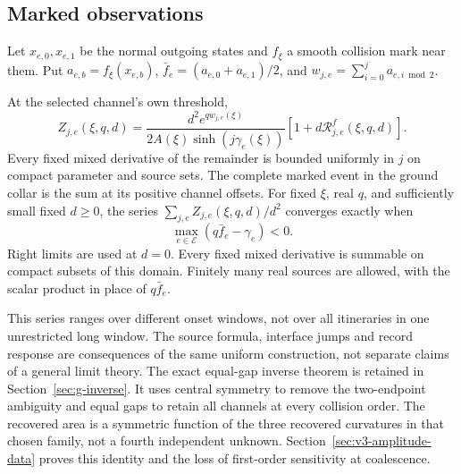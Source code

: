 \subsection{Marked observations}
Let $x_{e,0},x_{e,1}$ be the normal outgoing states and $f_\xi$ a smooth
collision mark near them. Put $a_{e,b}=f_\xi(x_{e,b})$,
$\bar f_e=(a_{e,0}+a_{e,1})/2$, and
$w_{j,e}=\sum_{i=0}^j a_{e,i\bmod2}$.
\begin{theorem}
\label{thm:g-marked}
At the selected channel's own threshold,
\begin{equation}\label{eq:g-marked}
 Z_{j,e}(\xi,q,d)=
 \frac{d^2e^{qw_{j,e}(\xi)}}{2A(\xi)\sinh(j\gamma_e(\xi))}
       [1+d\mathcal R^f_{j,e}(\xi,q,d)].
\end{equation}
Every fixed mixed derivative of the remainder is bounded uniformly in
$j$ on compact parameter and source sets. The complete marked event in
the ground collar is the sum at its positive channel offsets. For fixed
$\xi$, real $q$, and sufficiently small fixed $d\ge0$, the series
$\sum_{j,e}Z_{j,e}(\xi,q,d)/d^2$ converges exactly when
\begin{equation}\label{eq:g-source-domain}
           \max_{e\in\mathcal E}(q\bar f_e-\gamma_e)<0.
\end{equation}
Right limits are used at $d=0$. Every fixed mixed derivative is summable
on compact subsets of this domain. Finitely many real sources are
allowed, with the scalar product in place of $q\bar f_e$.
\end{theorem}

This series ranges over different onset windows, not over all
itineraries in one unrestricted long window. The source formula,
interface jumps and record response are consequences of the same
uniform construction, not separate claims of a general limit theory.
The exact equal-gap inverse theorem is retained in
Section~\ref{sec:g-inverse}. It uses central symmetry to remove the
two-endpoint ambiguity and equal gaps to retain all channels at every
collision order. The recovered area is a symmetric function of the
three recovered curvatures in that chosen family, not a fourth
independent unknown. Section~\ref{sec:v3-amplitude-data} proves this
identity and the loss of first-order sensitivity at coalescence.

